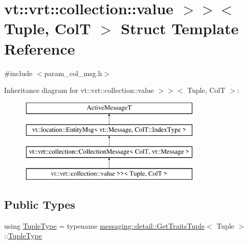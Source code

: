 \hypertarget{structvt_1_1vrt_1_1collection_1_1_param_col_msg_3_01_tuple_00_01_col_t_00_01std_1_1enable__if__tcc6a1858ebbc12bbfd81f56748245add}{}\section{vt\+:\+:vrt\+:\+:collection\+:\+:value $>$$>$$<$ Tuple, ColT $>$ Struct Template Reference}
\label{structvt_1_1vrt_1_1collection_1_1_param_col_msg_3_01_tuple_00_01_col_t_00_01std_1_1enable__if__tcc6a1858ebbc12bbfd81f56748245add}


{\ttfamily \#include $<$param\+\_\+col\+\_\+msg.\+h$>$}

Inheritance diagram for vt\+:\+:vrt\+:\+:collection\+:\+:value $>$$>$$<$ Tuple, ColT $>$\+:\begin{figure}[H]
\begin{center}
\leavevmode
\includegraphics[height=4.000000cm]{structvt_1_1vrt_1_1collection_1_1_param_col_msg_3_01_tuple_00_01_col_t_00_01std_1_1enable__if__tcc6a1858ebbc12bbfd81f56748245add}
\end{center}
\end{figure}
\subsection*{Public Types}
\begin{DoxyCompactItemize}
\item 
using \hyperlink{structvt_1_1vrt_1_1collection_1_1_param_col_msg_3_01_tuple_00_01_col_t_00_01std_1_1enable__if__tcc6a1858ebbc12bbfd81f56748245add_a86867847002b70c52126323faa830dd6}{Tuple\+Type} = typename \hyperlink{structvt_1_1messaging_1_1detail_1_1_get_traits_tuple}{messaging\+::detail\+::\+Get\+Traits\+Tuple}$<$ Tuple $>$\+::\hyperlink{structvt_1_1vrt_1_1collection_1_1_param_col_msg_3_01_tuple_00_01_col_t_00_01std_1_1enable__if__tcc6a1858ebbc12bbfd81f56748245add_a86867847002b70c52126323faa830dd6}{Tuple\+Type}
\end{DoxyCompactItemize}

